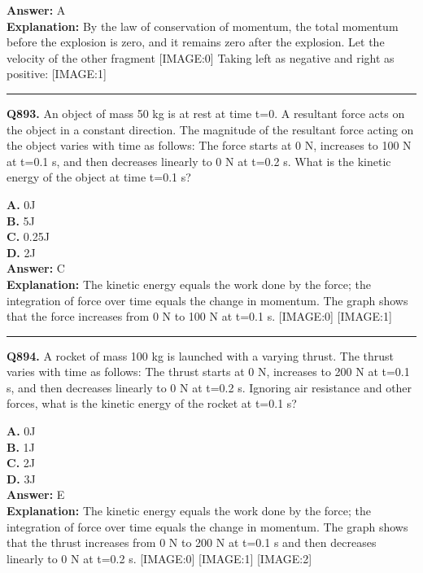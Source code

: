 \documentclass[12pt]{article}
\begin{document}
\textbf{Answer:} A \\
\textbf{Explanation:} By the law of conservation of momentum, the total momentum before the explosion is zero, and it remains zero after the explosion.
Let the velocity of the other fragment
[IMAGE:0]
Taking left as negative and right as positive:
[IMAGE:1]

\hrule
\vspace{1em}


\noindent
\textbf{Q893.} An object of mass 50 kg is at rest at time t=0. A resultant force acts on the object in a constant direction. The magnitude of the resultant force acting on the object varies with time as follows:
The force starts at 0 N, increases to 100 N at t=0.1 s, and then decreases linearly to 0 N at t=0.2 s.
What is the kinetic energy of the object at time t=0.1 s?



\textbf{A.} 0J \\
\textbf{B.} 5J \\
\textbf{C.} 0.25J \\
\textbf{D.} 2J \\

\textbf{Answer:} C \\
\textbf{Explanation:} The kinetic energy equals the work done by the force; the integration of force over time equals the change in momentum. The graph shows that the force increases from 0 N to 100 N at t=0.1 s.
[IMAGE:0]
[IMAGE:1]

\hrule
\vspace{1em}


\noindent
\textbf{Q894.} A rocket of mass 100 kg is launched with a varying thrust. The thrust varies with time as follows:
The thrust starts at 0 N, increases to 200 N at t=0.1 s, and then decreases linearly to 0 N at t=0.2 s.
Ignoring air resistance and other forces, what is the kinetic energy of the rocket at t=0.1 s?



\textbf{A.} 0J \\
\textbf{B.} 1J \\
\textbf{C.} 2J \\
\textbf{D.} 3J \\

\textbf{Answer:} E \\
\textbf{Explanation:} The kinetic energy equals the work done by the force; the integration of force over time equals the change in momentum. The graph shows that the thrust increases from 0 N to 200 N at t=0.1 s and then decreases linearly to 0 N at t=0.2 s.
[IMAGE:0]
[IMAGE:1]
[IMAGE:2]
\end{document}

